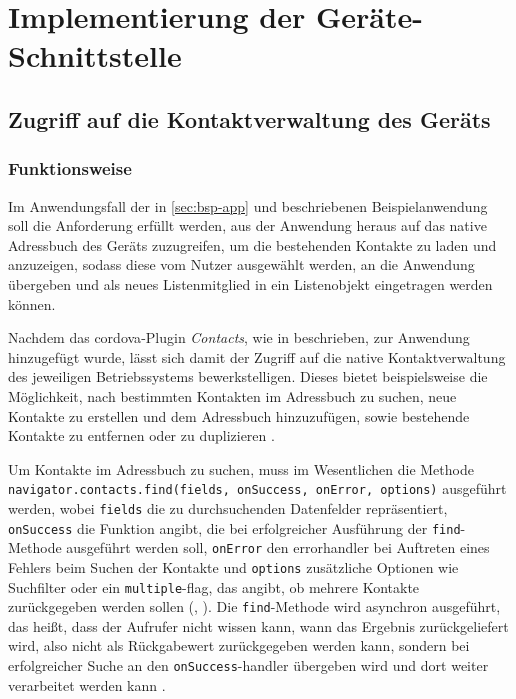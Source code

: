 \chapter{Implementierung der Geräte-Schnittstelle}	\label{sec:impl}

		
\section{Zugriff auf die Kontaktverwaltung des Geräts} \label{sec:contacts}

\subsection{Funktionsweise}

Im Anwendungsfall  der in \autoref{sec:bsp-app} und  beschriebenen Beispielanwendung soll die Anforderung erfüllt werden, aus der Anwendung heraus auf das native Adressbuch des Geräts zuzugreifen, um die bestehenden Kontakte zu laden und anzuzeigen, sodass diese vom Nutzer ausgewählt werden, an die Anwendung übergeben und als neues Listenmitglied in ein Listenobjekt eingetragen werden können.

Nachdem das \gls{cordova}-Plugin \emph{Contacts}, wie in  beschrieben, zur Anwendung hinzugefügt wurde, lässt sich damit der Zugriff auf die native Kontaktverwaltung des jeweiligen Betriebssystems bewerkstelligen.
Dieses bietet beispielsweise die Möglichkeit, nach bestimmten Kontakten im Adressbuch zu suchen, neue Kontakte zu erstellen und dem Adressbuch hinzuzufügen, sowie bestehende Kontakte zu entfernen oder zu duplizieren \cite{Cordova_Plugin_Registry_Contacts}.

Um Kontakte im Adressbuch zu suchen, muss im Wesentlichen die Methode \lstinline|navigator.contacts.find(fields, onSuccess, onError, options)| ausgeführt werden, wobei \lstinline|fields| die zu durchsuchenden Datenfelder repräsentiert, \lstinline|onSuccess| die Funktion angibt, die bei erfolgreicher Ausführung der \lstinline|find|-Methode ausgeführt werden soll, \lstinline|onError| den \gls{errorhandler} bei Auftreten eines Fehlers beim Suchen der Kontakte und \lstinline|options| zusätzliche Optionen wie Suchfilter oder ein \lstinline|multiple|-\gls{flag}, das angibt, ob mehrere Kontakte zurückgegeben werden sollen (, ).
Die \lstinline|find|-Methode wird \gls{asynchron} ausgeführt, das heißt, dass der Aufrufer nicht wissen kann, wann das Ergebnis zurückgeliefert wird, also nicht als Rückgabewert zurückgegeben werden kann, sondern bei erfolgreicher Suche an den \og \lstinline|onSuccess|-\gls{handler} übergeben wird und dort weiter verarbeitet werden kann \cite{Cordova_Plugin_Registry_Contacts}.

